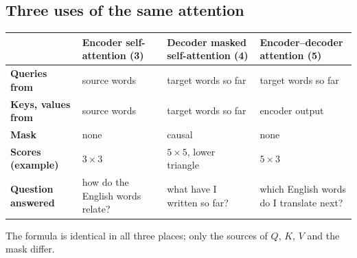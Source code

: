 \documentclass[11pt]{article}
\newcommand{\blk}[1]{\textbf{(#1)}}
\begin{document}
\subsection{Three uses of the same attention}
\begin{center}\small\renewcommand{\arraystretch}{1.3}
\begin{tabularx}{\textwidth}{>{\bfseries}p{2.9cm} X X X}\toprule
 & \textbf{Encoder self-attention \blk3} & \textbf{Decoder masked self-attention \blk4} & \textbf{Encoder--decoder attention \blk5}\\\midrule
Queries from & source words & target words so far & target words so far\\
Keys, values from & source words & target words so far & encoder output\\
Mask & none & causal & none\\
Scores (example) & $3\times3$ & $5\times5$, lower triangle & $5\times3$\\
Question answered & how do the English words relate? & what have I written so far? & which English words do I translate next?\\\bottomrule
\end{tabularx}\end{center}
The formula is identical in all three places; only the sources of $Q$, $K$, $V$ and the mask differ.
\end{document}

